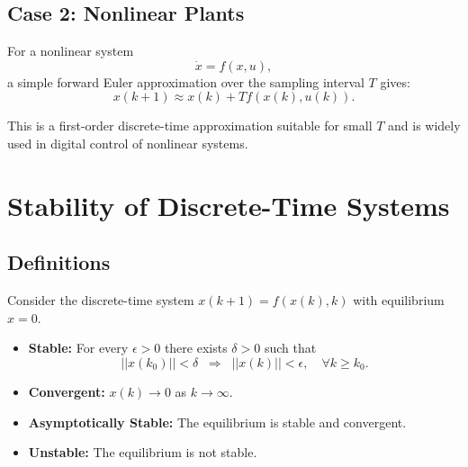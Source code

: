 \subsection{Case 2: Nonlinear Plants}

For a nonlinear system
\begin{equation}
\dot{x} = f(x,u),
\end{equation}
a simple forward Euler approximation over the sampling interval \(T\) gives:
\begin{equation}
\boxed{x(k+1) \approx x(k) + T f(x(k), u(k))}.
\end{equation}

This is a first-order discrete-time approximation suitable for small \(T\) and is widely used in digital control of nonlinear systems.

\section{Stability of Discrete-Time Systems}

\subsection{Definitions}
\begin{definition}
Consider the discrete-time system $x(k+1) = f(x(k),k)$ with equilibrium $x=0$.  
\begin{itemize}
    \item \textbf{Stable:} For every $\epsilon>0$ there exists $\delta>0$ such that
    \begin{equation}
    ||x(k_0)|| < \delta \;\; \Rightarrow \;\; ||x(k)|| < \epsilon, \quad \forall k \ge k_0.
    \end{equation}
    \item \textbf{Convergent:} $x(k) \to 0$ as $k \to \infty$.
    \item \textbf{Asymptotically Stable:} The equilibrium is stable and convergent.  
    \item \textbf{Unstable:} The equilibrium is not stable.  
\end{itemize}
\end{definition}


